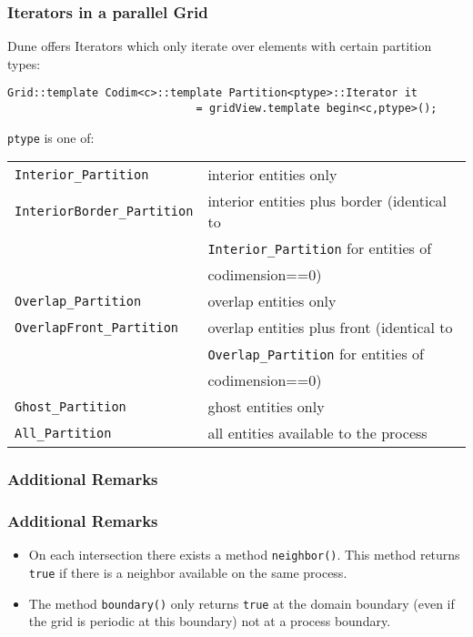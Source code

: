 \begin{frame}[fragile]
  \frametitle<presentation>{Iterators in a parallel Grid}
  \small
  Dune offers Iterators which only iterate over elements with certain partition types:\\
\begin{lstlisting}
Grid::template Codim<c>::template Partition<ptype>::Iterator it
                             = gridView.template begin<c,ptype>();
\end{lstlisting}

\lstinline!ptype! is one of:
  \begin{center}
    \begin{tabular}{ll}
      \texttt{Interior\_Partition} & interior entities only\\
      \texttt{InteriorBorder\_Partition} & interior entities plus border (identical to \\
                                         & \texttt{Interior\_Partition} for entities of \\
                                         & codimension==0)\\
      \texttt{Overlap\_Partition} & overlap entities only\\
      \texttt{OverlapFront\_Partition} & overlap entities plus front (identical to \\
                                       & \texttt{Overlap\_Partition} for entities of \\
                                       & codimension==0)\\
      \texttt{Ghost\_Partition} & ghost entities only\\
      \texttt{All\_Partition} & all entities available to the process
    \end{tabular}
  \end{center}
\end{frame}

\subsubsection{Additional Remarks}

\begin{frame}
\frametitle<presentation>{Additional Remarks}
\begin{itemize}
\item On each intersection there exists a method \lstinline!neighbor()!. This method returns \lstinline!true! if there is a
neighbor available on the same process.
\item The method \lstinline!boundary()! only returns \lstinline!true! at the domain boundary (even if the grid is periodic at this boundary) not at a process boundary.
\end{itemize}
\end{frame}

